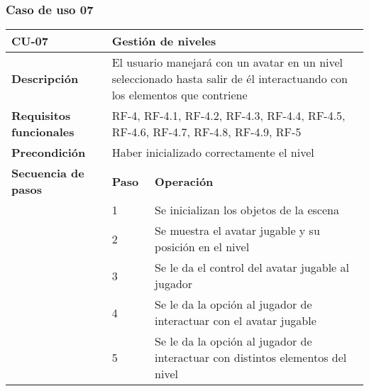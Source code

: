 \subsubsection{Caso de uso 07}
\begin{longtable}{lll}
\textbf{CU-07}                                   & \multicolumn{2}{l}{Gestión de niveles}                                                                                                         \\ \hline
\endfirsthead
%
\endhead
%
\hline
\endfoot
%
\endlastfoot
%
\textbf{Descripción}                             & \multicolumn{2}{l}{El usuario manejará con un avatar en un nivel seleccionado hasta salir de él interactuando con los elementos que contriene} \\ \hline
\textbf{Requisitos funcionales}                  & \multicolumn{2}{l}{RF-4, RF-4.1, RF-4.2, RF-4.3, RF-4.4, RF-4.5, RF-4.6, RF-4.7, RF-4.8, RF-4.9, RF-5}                                         \\ \hline
\textbf{Precondición}                            & \multicolumn{2}{l}{Haber inicializado correctamente el nivel}                                                                                  \\ \hline
\multicolumn{1}{l|}{\textbf{Secuencia de pasos}} & \textbf{Paso}                         & \textbf{Operación}                                                                                     \\ \cline{2-3} 
\multicolumn{1}{l|}{}                            & 1                                     & Se inicializan los objetos de la escena                                                                \\
\multicolumn{1}{l|}{}                            & 2                                     & Se muestra el avatar jugable y su posición en el nivel                                                 \\
\multicolumn{1}{l|}{}                            & 3                                     & Se le da el control del avatar jugable al jugador                                                      \\
\multicolumn{1}{l|}{}                            & 4                                     & Se le da la opción al jugador de interactuar con el avatar jugable                                     \\
\multicolumn{1}{l|}{}                            & 5                                     & Se le da la opción al jugador de interactuar con distintos elementos del nivel                         \\

\end{longtable}
